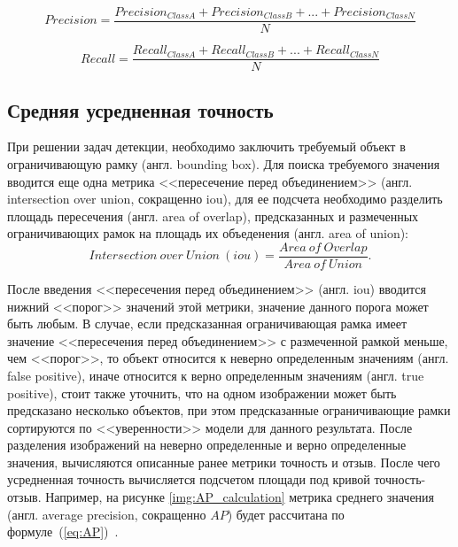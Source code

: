 \begin{equation}
\label{eq:precision}
Precision = \frac{Precision_{Class A} + Precision_{Class B} + ... + Precision_{Class N}}{N}
\end{equation}

\begin{equation}
\label{eq:recall}
Recall = \frac{Recall_{Class A} + Recall_{Class B} + ... + Recall_{Class N}}{N}
\end{equation}




\subsection{Средняя усредненная точность}
При решении задач детекции, необходимо заключить требуемый объект в ограничивающую рамку (англ. bounding box).
Для поиска требуемого значения вводится еще одна метрика <<пересечение перед объединением>> (англ. intersection over union, сокращенно iou),
для ее подсчета необходимо разделить площадь пересечения (англ. area of overlap), предсказанных и  размеченных ограничивающих рамок на площадь их объеденения (англ. area of union):
\begin{equation}
Intersection\ over\ Union\ (iou) = \frac{Area\ of\ Overlap}{Area\ of\ Union}.
\end{equation}

После введения <<пересечения перед объединением>> (англ. iou) вводится нижний <<порог>>  значений этой метрики, значение данного порога может быть любым. В случае, 
если предсказанная ограничивающая рамка имеет значение <<пересечения перед объединением>> с размеченной рамкой меньше, чем <<порог>>, то объект относится  к неверно определенным значениям (англ. false positive), 
иначе относится к верно определенным значениям (англ. true positive), стоит также уточнить, что на одном изображении может быть предсказано несколько объектов, при этом предсказанные ограничивающие рамки сортируются по <<уверенности>> модели для данного результата.
После разделения изображений на неверно определенные и верно определенные значения, вычисляются описанные ранее метрики точность и отзыв.
После чего усредненная точность вычисляется подсчетом площади под кривой точность-отзыв. Например, на рисунке \ref{img:AP_calculation} метрика
среднего значения (англ. average precision, сокращенно $AP$) будет рассчитана по формуле~(\ref{eq:AP})~\cite{mAP}.

